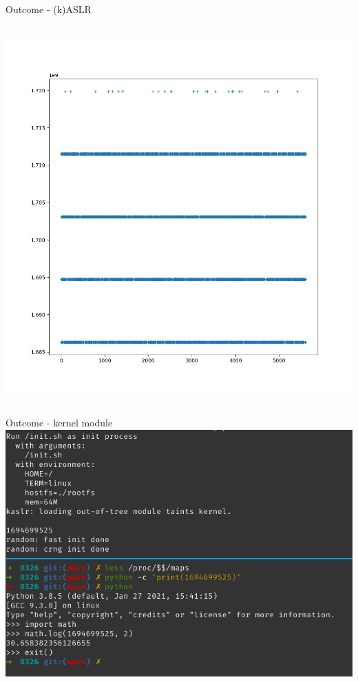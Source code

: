 \documentclass{beamer}
\begin{document}
\begin{frame}{Outcome - (k)ASLR}
\begin{columns}
\begin{column}{.5\textwidth}
            \centering\includegraphics[width=\textwidth]{kaslr.png}
        \end{column}
    \end{columns}
\end{frame}

\begin{frame}{Outcome - kernel module}
    \centering\includegraphics[width=.9\textwidth]{k32_1G.png}
\end{frame}
\end{document}
